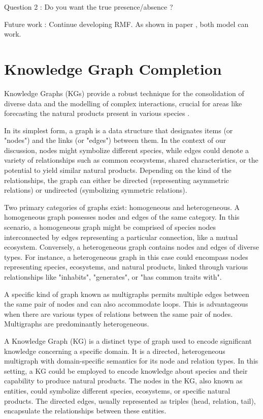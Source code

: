 \documentclass[
11pt, %
oneside, %
english, %
singlespacing, %
headsepline, %
chapterinoneline, %
]{MastersDoctoralThesis} %
\begin{document}
Question 2 : Do you want the true presence/absence ?


Future work : Continue developing RMF. As shown in paper \cite{jiaGraphBeliefPropagation2021}, both model can work. 
\section{Knowledge Graph Completion}
Knowledge Graphs (KGs) provide a robust technique for the consolidation of diverse data and the modelling of complex interactions, crucial for areas like forecasting the natural products present in various species \cite{ehrlingerDefinitionKnowledgeGraphs2016}. 

In its simplest form, a graph is a data structure that designates items (or "nodes") and the links (or "edges") between them. In the context of our discussion, nodes might symbolize different species, while edges could denote a variety of relationships such as common ecosystems, shared characteristics, or the potential to yield similar natural products. Depending on the kind of the relationships, the graph can either be directed (representing asymmetric relations) or undirected (symbolizing symmetric relations).

Two primary categories of graphs exist: homogeneous and heterogeneous. A homogeneous graph possesses nodes and edges of the same category. In this scenario, a homogeneous graph might be comprised of species nodes interconnected by edges representing a particular connection, like a mutual ecosystem. Conversely, a heterogeneous graph contains nodes and edges of diverse types. For instance, a heterogeneous graph in this case could encompass nodes representing species, ecosystems, and natural products, linked through various relationships like "inhabits", "generates", or "has common traits with".

A specific kind of graph known as multigraphs permits multiple edges between the same pair of nodes and can also accommodate loops. This is advantageous when there are various types of relations between the same pair of nodes. Multigraphs are predominantly heterogeneous.

A Knowledge Graph (KG) is a distinct type of graph used to encode significant knowledge concerning a specific domain. It is a directed, heterogeneous multigraph with domain-specific semantics for its node and relation types. In this setting, a KG could be employed to encode knowledge about species and their capability to produce natural products. The nodes in the KG, also known as entities, could symbolize different species, ecosystems, or specific natural products. The directed edges, usually represented as triples (head, relation, tail), encapsulate the relationships between these entities.
\end{document}
